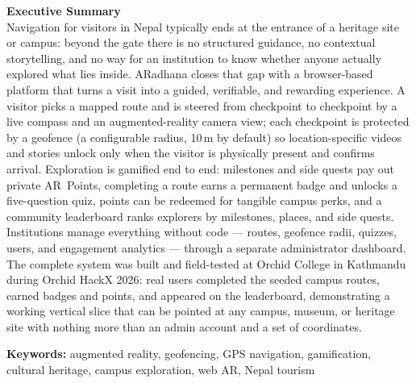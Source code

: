 \documentclass[11pt,a4paper]{report}
\newcommand{\projectname}{ARadhana}
\begin{document}
{\noindent\sffamily\large\bfseries\color{orchidnavy}Executive Summary}\\[6pt]
Navigation for visitors in Nepal typically ends at the entrance of a heritage
site or campus: beyond the gate there is no structured guidance, no contextual
storytelling, and no way for an institution to know whether anyone actually
explored what lies inside. \projectname{} closes that gap with a browser-based
platform that turns a visit into a guided, verifiable, and rewarding
experience. A visitor picks a mapped route and is steered from checkpoint to
checkpoint by a live compass and an augmented-reality camera view; each
checkpoint is protected by a geofence (a configurable radius, 10\,m by
default) so location-specific videos and stories unlock only when the visitor
is physically present and confirms arrival. Exploration is gamified end to
end: milestones and side quests pay out private AR~Points, completing a route
earns a permanent badge and unlocks a five-question quiz, points can be
redeemed for tangible campus perks, and a community leaderboard ranks
explorers by milestones, places, and side quests. Institutions manage
everything without code --- routes, geofence radii, quizzes, users, and
engagement analytics --- through a separate administrator dashboard. The
complete system was built and field-tested at Orchid College in Kathmandu
during Orchid HackX 2026: real users completed the seeded campus routes,
earned badges and points, and appeared on the leaderboard, demonstrating a
working vertical slice that can be pointed at any campus, museum, or heritage
site with nothing more than an admin account and a set of coordinates.

\vspace{0.5em}
\noindent\textbf{Keywords:} augmented reality, geofencing, GPS navigation,
gamification, cultural heritage, campus exploration, web AR, Nepal tourism

\clearpage
\tableofcontents
\clearpage













\newpage
\renewcommand{\bibname}{References}
\nocite{*} %



\newpage

\appendix


\end{document}
